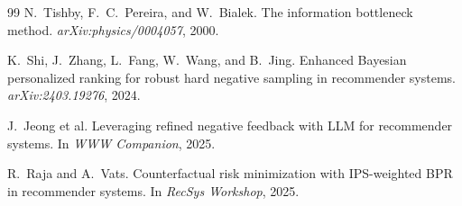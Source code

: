 \documentclass[11pt,a4paper]{article}
\begin{document}
\begin{thebibliography}{99}
N.~Tishby, F.~C.~Pereira, and W.~Bialek.
\newblock The information bottleneck method.
\newblock \emph{arXiv:physics/0004057}, 2000.

K.~Shi, J.~Zhang, L.~Fang, W.~Wang, and B.~Jing.
\newblock Enhanced {B}ayesian personalized ranking for robust hard negative sampling in recommender systems.
\newblock \emph{arXiv:2403.19276}, 2024.

J.~Jeong et al.
\newblock Leveraging refined negative feedback with {LLM} for recommender systems.
\newblock In \emph{WWW Companion}, 2025.

R.~Raja and A.~Vats.
\newblock Counterfactual risk minimization with {IPS}-weighted {BPR} in recommender systems.
\newblock In \emph{RecSys Workshop}, 2025.

\end{thebibliography}
\end{document}
